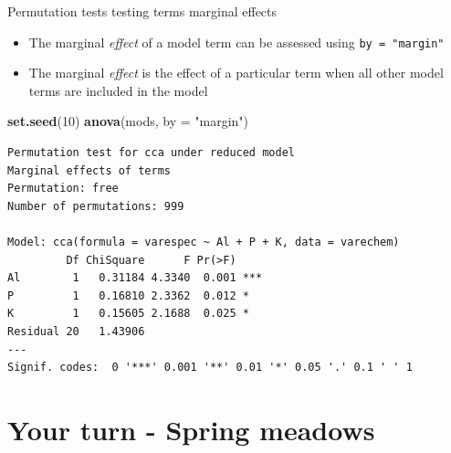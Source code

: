 \documentclass[10pt,ignorenonframetext,compress, aspectratio=169]{beamer}
\newenvironment{Shaded}{\begin{snugshade}}{\end{snugshade}}
\newcommand{\KeywordTok}[1]{\textcolor[rgb]{0.13,0.29,0.53}{\textbf{{#1}}}}
\newcommand{\DataTypeTok}[1]{\textcolor[rgb]{0.13,0.29,0.53}{{#1}}}
\newcommand{\DecValTok}[1]{\textcolor[rgb]{0.00,0.00,0.81}{{#1}}}
\newcommand{\StringTok}[1]{\textcolor[rgb]{0.31,0.60,0.02}{{#1}}}
\newcommand{\NormalTok}[1]{{#1}}
\providecommand{\tightlist}{%
  \setlength{\itemsep}{0pt}\setlength{\parskip}{0pt}}
\begin{document}
\begin{frame}[fragile]{Permutation tests \textbar{} testing terms
marginal effects}

\begin{itemize}
\tightlist
\item
  The marginal \emph{effect} of a model term can be assessed using
  \texttt{by\ =\ "margin"}
\item
  The marginal \emph{effect} is the effect of a particular term when all
  other model terms are included in the model
\end{itemize}

\tiny

\begin{Shaded}
\begin{Highlighting}[]
\KeywordTok{set.seed}\NormalTok{(}\DecValTok{10}\NormalTok{)}
\KeywordTok{anova}\NormalTok{(mods, }\DataTypeTok{by =} \StringTok{"margin"}\NormalTok{)}
\end{Highlighting}
\end{Shaded}

\begin{verbatim}
Permutation test for cca under reduced model
Marginal effects of terms
Permutation: free
Number of permutations: 999

Model: cca(formula = varespec ~ Al + P + K, data = varechem)
         Df ChiSquare      F Pr(>F)    
Al        1   0.31184 4.3340  0.001 ***
P         1   0.16810 2.3362  0.012 *  
K         1   0.15605 2.1688  0.025 *  
Residual 20   1.43906                  
---
Signif. codes:  0 '***' 0.001 '**' 0.01 '*' 0.05 '.' 0.1 ' ' 1
\end{verbatim}

\normalsize

\end{frame}

\section{Your turn - Spring meadows}\label{your-turn---spring-meadows}
\end{document}
